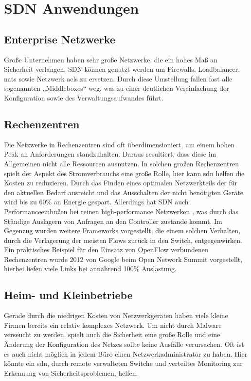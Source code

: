 \documentclass[twoside,12pt]{scrartcl}
\begin{document}
\section{SDN Anwendungen}
	\subsection{Enterprise Netzwerke}
	Große Unternehmen haben sehr große Netzwerke, die ein hohes Maß an Sicherheit verlangen. SDN können genutzt werden um Firewalls, Loadbalancer, \gls{nat}s sowie Netzwerk \gls{acl}s zu ersetzen. Durch diese Umstellung fallen fast alle sogenannten „Middleboxes“ weg, was zu einer deutlichen Vereinfachung der Konfiguration sowie des Verwaltungsaufwandes führt.
	\subsection{Rechenzentren}
	Die Netzwerke in Rechenzentren sind oft überdimensioniert, um einem hohen Peak an Anforderungen standzuhalten. Daraus resultiert, dass diese im Allgemeinen nicht alle Ressourcen ausnutzen. In solchen großen Rechenzentren spielt der Aspekt des Stromverbrauchs eine große Rolle, hier kann \gls{sdn} helfen die Kosten zu reduzieren. Durch das Finden eines optimalen Netzwerkteils der für den aktuellen Bedarf ausreicht und das Ausschalten der nicht benötigten Geräte wird bis zu 60\% an Energie gespart. Allerdings hat SDN auch Performanceeinbußen bei reinen high-performance Netzwerken \cite{6730793}, was durch das Ständige Auslagern von Anfragen an den Controller zustande kommt. Im Gegenzug wurden weitere Frameworks vorgestellt, die einem solchen Verhalten, durch die Verlagerung der meisten Flows zurück in den Switch, entgegenwirken. Ein praktisches Beispiel für den Einsatz von OpenFlow verbundenen Rechenzentren wurde 2012 von Google beim Open Network Summit vorgestellt, hierbei liefen viele Links bei annährend 100\% Auslastung.
	\subsection{Heim- und Kleinbetriebe}
	Gerade durch die niedrigen Kosten von Netzwerkgeräten haben viele kleine Firmen bereits ein relativ komplexes Netzwerk. Um nicht durch Malware verseucht zu werden, spielt auch die Sicherheit eine große Rolle und eine Änderung der Konfiguration des Netzes sollte keine Ausfälle verursachen. Oft ist es auch nicht möglich in jedem Büro einen Netzwerkadministrator zu haben. Hier könnte ein \gls{sdn}, durch remote verwalteten Switche und verteiltes Monitoring zur Erkennung von Sicherheitsproblemen, helfen.
\end{document}
